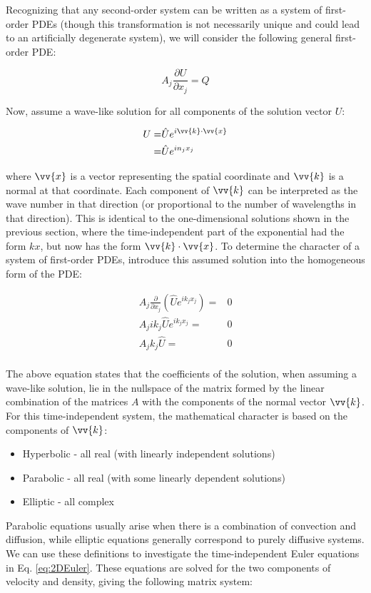 \documentclass[10pt]{article}
\newcommand{\beq}{\begin{equation}}
\newcommand{\eeq}{\end{equation}}
\newcommand{\beqa}{\begin{equation}\begin{aligned}}
\newcommand{\eeqa}{\end{aligned}\end{equation}}
\begin{document}
\begin{flushleft}
Recognizing that any second-order system can be written as a system of first-order PDEs (though this transformation is not necessarily unique and could lead to an artificially degenerate system), we will consider the following general first-order PDE:

\beq
\label{eq:SteadyStateEqn}
A_j\frac{\partial U}{\partial x_j}=Q
\eeq

Now, assume a wave-like solution for all components of the solution vector \(U\):

\beqa
\label{eq:WaveSolution}
U=&\hat{U}e^{i\vv{k}\cdot\vv{x}}\\
=&\hat{U}e^{in_jx_j}\\
\eeqa

where \(\vv{x}\) is a vector representing the spatial coordinate and \(\vv{k}\) is a normal at that coordinate. Each component of \(\vv{k}\) can be interpreted as the wave number in that direction (or proportional to the number of wavelengths in that direction). This is identical to the one-dimensional solutions shown in the previous section, where the time-independent part of the exponential had the form \(kx\), but now has the form \(\vv{k}\cdot\vv{x}\). To determine the character of a system of first-order PDEs, introduce this assumed solution into the homogeneous form of the PDE:

\beqa
\label{eq:Condition}
A_j\frac{\partial}{\partial x_j}\left(\hat{U}e^{ik_jx_j}\right)=&0\\
A_jik_j\hat{U}e^{ik_jx_j}=&0\\
A_jk_j\hat{U}=&0\\
\eeqa

The above equation states that the coefficients of the solution, when assuming a wave-like solution, lie in the nullspace of the matrix formed by the linear combination of the matrices \(A\) with the components of the normal vector \(\vv{k}\). For this time-independent system, the mathematical character is based on the components of \(\vv{k}\):

\begin{itemize}
\item Hyperbolic - all real (with linearly independent solutions)
\item Parabolic - all real (with some linearly dependent solutions)
\item Elliptic - all complex
\end{itemize}

Parabolic equations usually arise when there is a combination of convection and diffusion, while elliptic equations generally correspond to purely diffusive systems. We can use these definitions to investigate the time-independent Euler equations in Eq. \eqref{eq:2DEuler}. These equations are solved for the two components of velocity and density, giving the following matrix system:


\end{flushleft}
\end{document}
